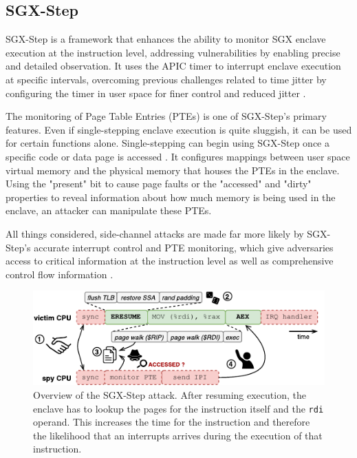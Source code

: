 \documentclass{llncs}
\begin{document}
\subsection{SGX-Step}
SGX-Step \cite{BulckPS17} is a framework that enhances the ability to monitor SGX enclave execution at the instruction level, addressing vulnerabilities by enabling precise and detailed observation. It uses the APIC timer to interrupt enclave execution at specific intervals, overcoming previous challenges related to time jitter by configuring the timer in user space for finer control and reduced jitter \cite{ArnautovTGKMPLM16}.

The monitoring of Page Table Entries (PTEs) is one of SGX-Step's primary features. Even if single-stepping enclave execution is quite sluggish, it can be used for certain functions alone. Single-stepping can begin using SGX-Step once a specific code or data page is accessed \cite{BulckWKPS17}. It configures mappings between user space virtual memory and the physical memory that houses the PTEs in the enclave. Using the "present" bit to cause page faults \cite{XuCP15} or the "accessed" and "dirty" properties to reveal information about how much memory is being used in the enclave, an attacker can manipulate these PTEs.

All things considered, side-channel attacks are made far more likely by SGX-Step's accurate interrupt control and PTE monitoring, which give adversaries access to critical information at the instruction level as well as comprehensive control flow information \cite{BulckPS17}.

\begin{figure}[t]
  \centering
  \includegraphics{images/sgx-step-pte.pdf}
  \caption{Overview of the SGX-Step attack.
    After resuming execution, the enclave has to lookup the pages for
    the instruction itself and the \texttt{rdi} operand. This increases the time
    for the instruction and therefore the likelihood that an interrupts arrives
    during the execution of that instruction.}
  \label{fig:sgx-step-pte}
\end{figure}
\end{document}
